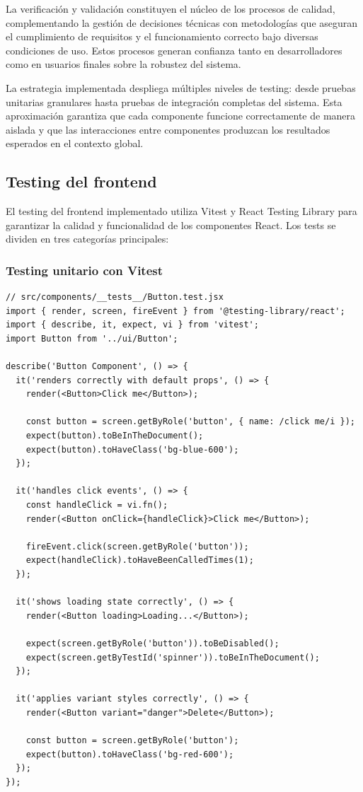 \documentclass[12pt,a4paper,oneside]{report}
\begin{document}
La verificación y validación constituyen el núcleo de los procesos de calidad, complementando la gestión de decisiones técnicas con metodologías que aseguran el cumplimiento de requisitos y el funcionamiento correcto bajo diversas condiciones de uso. Estos procesos generan confianza tanto en desarrolladores como en usuarios finales sobre la robustez del sistema.

La estrategia implementada despliega múltiples niveles de testing: desde pruebas unitarias granulares hasta pruebas de integración completas del sistema. Esta aproximación garantiza que cada componente funcione correctamente de manera aislada y que las interacciones entre componentes produzcan los resultados esperados en el contexto global.

\subsection{Testing del frontend}\label{testing-del-frontend}

El testing del frontend implementado utiliza Vitest y React Testing Library para garantizar la calidad y funcionalidad de los componentes React. Los tests se dividen en tres categorías principales:

\subsubsection{Testing unitario con
Vitest}\label{testing-unitario-con-vitest}

\begin{lstlisting}
// src/components/__tests__/Button.test.jsx
import { render, screen, fireEvent } from '@testing-library/react';
import { describe, it, expect, vi } from 'vitest';
import Button from '../ui/Button';

describe('Button Component', () => {
  it('renders correctly with default props', () => {
    render(<Button>Click me</Button>);
    
    const button = screen.getByRole('button', { name: /click me/i });
    expect(button).toBeInTheDocument();
    expect(button).toHaveClass('bg-blue-600');
  });

  it('handles click events', () => {
    const handleClick = vi.fn();
    render(<Button onClick={handleClick}>Click me</Button>);
    
    fireEvent.click(screen.getByRole('button'));
    expect(handleClick).toHaveBeenCalledTimes(1);
  });

  it('shows loading state correctly', () => {
    render(<Button loading>Loading...</Button>);
    
    expect(screen.getByRole('button')).toBeDisabled();
    expect(screen.getByTestId('spinner')).toBeInTheDocument();
  });

  it('applies variant styles correctly', () => {
    render(<Button variant="danger">Delete</Button>);
    
    const button = screen.getByRole('button');
    expect(button).toHaveClass('bg-red-600');
  });
});
\end{lstlisting}
\end{document}
